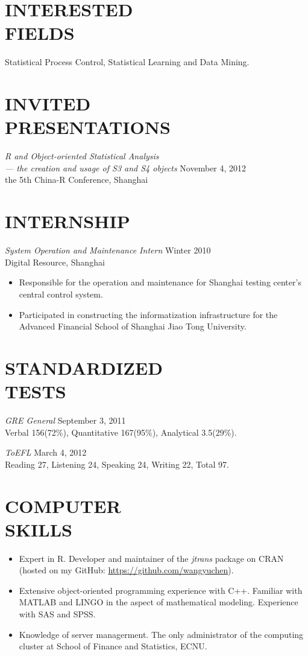 \documentclass[margin]{res}
\begin{document}
\begin{resume}
		\section{INTERESTED \\FIELDS} 
		Statistical Process Control, Statistical Learning and Data Mining.

		\section{INVITED \\PRESENTATIONS}
		{\sl R and Object-oriented Statistical Analysis\\
		 — the creation and usage of S3 and S4 objects} \hfill November 4, 2012\\
		the 5th China-R Conference, Shanghai

		\section{INTERNSHIP} 
		{\sl System Operation and Maintenance Intern} \hfill Winter 2010 \\
		Digital Resource, Shanghai
		\begin{itemize}  \itemsep -2pt %
			\item Responsible for the operation and maintenance for Shanghai testing center's central control system.
			\item Participated in constructing the informatization infrastructure for the Advanced Financial School of Shanghai Jiao Tong University.
		\end{itemize} 
		
		\section{STANDARDIZED \\TESTS} 
		{\sl GRE General} \hfill September 3, 2011 \\
		Verbal 156(72\%), Quantitative 167(95\%), Analytical 3.5(29\%).
		
		{\sl ToEFL}  \hfill March 4, 2012 \\
		Reading 27, Listening 24, Speaking 24, Writing 22, Total 97. 
		
		
		\section{COMPUTER \\ SKILLS}
		\begin{itemize}  \itemsep -2pt %
			\item Expert in R. Developer and maintainer of the \emph{jtrans} package on CRAN (hosted on my GitHub: \url{https://github.com/wangyuchen}). 
			\item Extensive object-oriented programming experience with C++. Familiar with MATLAB and LINGO in the aspect of mathematical modeling. Experience with SAS and SPSS. 
			\item Knowledge of server managerment. The only administrator of the computing cluster at School of Finance and Statistics, ECNU. 
		\end{itemize}
		 

\end{resume}
\end{document}
